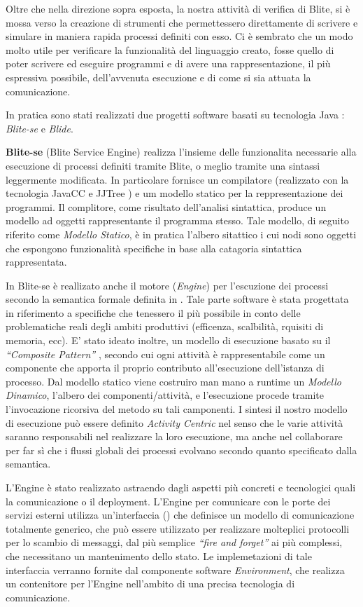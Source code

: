 Oltre che nella direzione sopra esposta, la nostra attività di verifica di
Blite, si è mossa verso la creazione di strumenti che permettessero
direttamente di scrivere e simulare in maniera rapida processi definiti con
esso. Ci è sembrato che un modo molto utile per verificare la funzionalità del
linguaggio creato, fosse quello di poter scrivere ed eseguire programmi e di avere una
rappresentazione, il più espressiva possibile, dell'avvenuta esecuzione e di
come si sia attuata la comunicazione.

In pratica sono stati realizzati due progetti software basati su tecnologia
Java \cite{Java}: \emph{Blite-se} e \emph{Blide}. 

\textbf{Blite-se} (Blite Service Engine) realizza l'insieme delle funzionalita
necessarie alla esecuzione di processi definiti tramite Blite, o meglio tramite una sintassi
leggermente modificata. In particolare fornisce un compilatore (realizzato con la
tecnologia JavaCC e JJTree \cite{JavaCC}) e um modello statico per la
reppresentazione dei programmi. Il complitore, come risultato dell'analisi sintattica, produce un modello ad
oggetti rappresentante il programma stesso. Tale modello, di seguito riferito come
\emph{Modello Statico}, è in pratica l'albero sitattico i cui nodi sono oggetti
che espongono funzionalità specifiche in base alla catagoria sintattica rappresentata. 

In Blite-se è reallizato anche il motore (\emph{Engine}) per l'escuzione dei
processi secondo la semantica formale definita in \cite{LaPuTie1}. Tale parte software
è stata progettata in riferimento a specifiche che tenessero il più possibile in
conto delle problematiche reali degli ambiti produttivi (efficenza, scalbilità,
rquisiti di memoria, ecc). E' stato ideato inoltre, un modello di esecuzione
basato su il \emph{``Composite Pattern''} \cite{GANGo4}, secondo cui ogni attività è
rappresentabile come un componente che apporta il proprio contributo
all'esecuzione dell'istanza di processo. Dal modello statico viene costruiro man
mano a runtime un \emph{Modello Dinamico}, l'albero dei componenti/attività, e
l'esecuzione procede tramite l'invocazione ricorsiva del metodo
 su tali camponenti. I sintesi il nostro modello di
esecuzione può essere definito \emph{Activity Centric} nel senso che le varie
attività saranno responsabili nel realizzare la loro esecuzione, ma anche nel
collaborare per far sì che i flussi globali dei processi evolvano secondo quanto
specificato dalla semantica.

L'Engine è stato realizzato astraendo dagli aspetti più concreti e
tecnologici quali la comunicazione o il deployment. L'Engine per comunicare con
le porte dei servizi esterni utilizza un'interfaccia () che
definisce un modello di comunicazione totalmente generico, che può essere
utilizzato per realizzare molteplici protocolli per lo scambio di messaggi, dal
più semplice \emph{``fire and forget''} ai più complessi, che necessitano un
mantenimento dello stato. Le implemetazioni di tale interfaccia verranno fornite
dal componente software \emph{Environment}, che realizza un contenitore per
l'Engine nell'ambito di una precisa tecnologia di comunicazione. 

